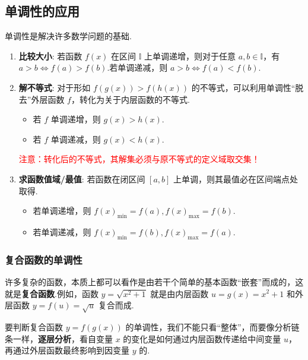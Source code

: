 \subsection{单调性的应用}
单调性是解决许多数学问题的基础.
\begin{enumerate}
	\item \textbf{比较大小}: 若函数 $f(x)$ 在区间 $\mathbb{I}$ 上单调递增，则对于任意 $a,b \in \mathbb{I}$，有 $a>b \iff f(a)>f(b)$.若单调递减，则 $a>b \iff f(a)<f(b)$.
	\item \textbf{解不等式}: 对于形如 $f(g(x)) > f(h(x))$ 的不等式，可以利用单调性“脱去”外层函数 $f$，转化为关于内层函数的不等式.
	\begin{itemize}
		\item 若 $f$ 单调递增，则 $g(x) > h(x)$.
		\item 若 $f$ 单调递减，则 $g(x) < h(x)$.
	\end{itemize}
	\textcolor{red}{注意：转化后的不等式，其解集必须与原不等式的定义域取交集！}
	\item \textbf{求函数值域/最值}: 若函数在闭区间 $[a,b]$ 上单调，则其最值必在区间端点处取得.
	\begin{itemize}
		\item 若单调递增，则 $f(x)_{\min}=f(a), f(x)_{\max}=f(b)$.
		\item 若单调递减，则 $f(x)_{\min}=f(b), f(x)_{\max}=f(a)$.
	\end{itemize}
\end{enumerate}

\subsubsection*{复合函数的单调性}
许多复杂的函数，本质上都可以看作是由若干个简单的基本函数“嵌套”而成的，这就是\textbf{复合函数}.例如，函数 $y=\sqrt{x^2+1}$ 就是由内层函数 $u=g(x)=x^2+1$ 和外层函数 $y=f(u)=\sqrt{u}$ 复合而成.

要判断复合函数 $y=f(g(x))$ 的单调性，我们不能只看“整体”，而要像分析链条一样，\textbf{逐层分析}，看自变量 $x$ 的变化是如何通过内层函数传递给中间变量 $u$，再通过外层函数最终影响到因变量 $y$ 的.

